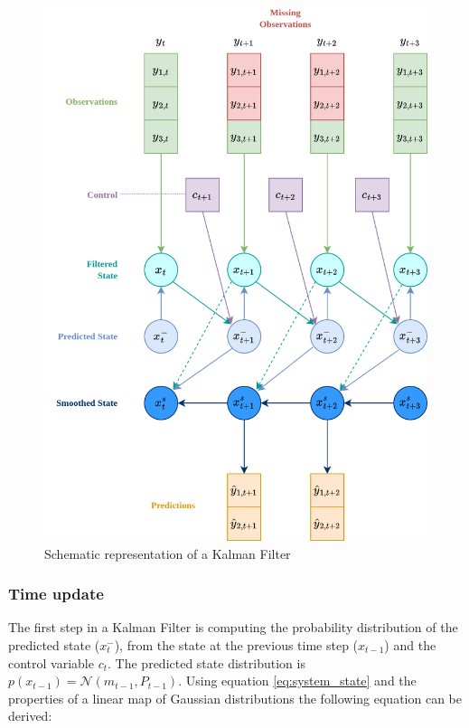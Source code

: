 \documentclass{article}
\begin{document}
\begin{figure}
\includegraphics[width=\textwidth]{Kalman Filter figure.png}
\caption{Schematic representation of a Kalman Filter}
\label{fig:kalman_filter}
\end{figure}

\subsubsection{Time update}

The first step in a Kalman Filter is computing the probability distribution of the predicted state ($x^-_t$), from the state at the previous time step ($x_{t-1}$) and the control variable $c_t$. The predicted state distribution is $p(x_{t-1}) = \mathcal{N}(m_{t-1}, P_{t-1})$.  Using equation \ref{eq:system_state} and the properties of a linear map of Gaussian distributions the following equation can be derived:
\end{document}
